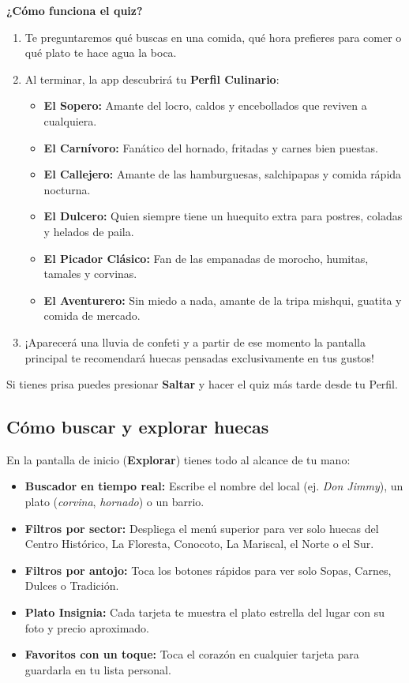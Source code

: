 \documentclass[11pt, a4paper, oneside]{article}
\begin{document}
\begin{stepbox}
\textbf{¿Cómo funciona el quiz?}
\begin{enumerate}
  \item Te preguntaremos qué buscas en una comida, qué hora prefieres para comer o qué plato te hace agua la boca.
  \item Al terminar, la app descubrirá tu \textbf{Perfil Culinario}:
  \begin{itemize}
    \item \textbf{El Sopero:} Amante del locro, caldos y encebollados que reviven a cualquiera.
    \item \textbf{El Carnívoro:} Fanático del hornado, fritadas y carnes bien puestas.
    \item \textbf{El Callejero:} Amante de las hamburguesas, salchipapas y comida rápida nocturna.
    \item \textbf{El Dulcero:} Quien siempre tiene un huequito extra para postres, coladas y helados de paila.
    \item \textbf{El Picador Clásico:} Fan de las empanadas de morocho, humitas, tamales y corvinas.
    \item \textbf{El Aventurero:} Sin miedo a nada, amante de la tripa mishqui, guatita y comida de mercado.
  \end{itemize}
  \item ¡Aparecerá una lluvia de confeti y a partir de ese momento la pantalla principal te recomendará huecas pensadas exclusivamente en tus gustos!
\end{enumerate}
\end{stepbox}

\begin{tipbox}
Si tienes prisa puedes presionar \textbf{Saltar} y hacer el quiz más tarde desde tu Perfil.
\end{tipbox}

\subsection{Cómo buscar y explorar huecas}
En la pantalla de inicio (\textbf{Explorar}) tienes todo al alcance de tu mano:
\begin{itemize}
  \item \textbf{Buscador en tiempo real:} Escribe el nombre del local (ej. \textit{Don Jimmy}), un plato (\textit{corvina}, \textit{hornado}) o un barrio.
  \item \textbf{Filtros por sector:} Despliega el menú superior para ver solo huecas del Centro Histórico, La Floresta, Conocoto, La Mariscal, el Norte o el Sur.
  \item \textbf{Filtros por antojo:} Toca los botones rápidos para ver solo Sopas, Carnes, Dulces o Tradición.
  \item \textbf{Plato Insignia:} Cada tarjeta te muestra el plato estrella del lugar con su foto y precio aproximado.
  \item \textbf{Favoritos con un toque:} Toca el corazón en cualquier tarjeta para guardarla en tu lista personal.
\end{itemize}
\end{document}
